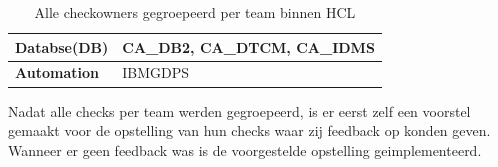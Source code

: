 \begin{table}[h]
\begin{tabular}{|l|p{9cm}|}
		\textbf{Databse(DB)}               & CA\_DB2, CA\_DTCM, CA\_IDMS                                                                                                                                            \\ \hline
		\textbf{Automation}                & IBMGDPS                                                                                                                                                                \\ \hline
	\end{tabular}
	\caption[Checks Per team]{Alle checkowners gegroepeerd per team binnen HCL}
	\label{tbl:Checks Per Team}
\end{table}

Nadat alle checks per team werden gegroepeerd, is er eerst zelf een voorstel gemaakt voor de opstelling van hun checks waar zij feedback op konden geven. Wanneer er geen feedback was is de voorgestelde opstelling geimplementeerd.